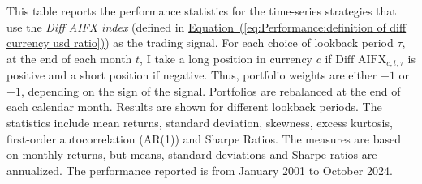 \documentclass[12pt,oneside,letter]{article}
\newcommand*{\myeq}[1]{\hyperref[{#1}]{Equation~(\ref*{#1})}}
\begin{document}
\begin{appendices}
\begin{landscape}
\begin{table}[h]
	
		\centering

	\end{table}
\end{landscape}


		\begin{landscape}
	\begin{table}[h]
		\caption{\bf Performance Statistics}   \label{tab:Performance:ts AI strategy diff performance statistics}
	
		\begin{footnotesize}
			This table reports the performance statistics for the time-series strategies that use the \textit{Diff AIFX index} (defined in \myeq{eq:Performance:definition of diff currency usd ratio}) as the trading signal. For each choice of lookback period \(\tau\), at  the end of each month \(t\), I take a long position in currency \(c\) if \(\text{Diff AIFX}_{c,t,\tau}\) is positive and a short position if negative. Thus, portfolio weights are either \(+1\) or \(-1\), depending on the sign of the signal. Portfolios are rebalanced at the end of each calendar month. Results are shown for different lookback periods. The statistics include mean returns, standard deviation, skewness, excess kurtosis, first-order autocorrelation (AR(1)) and Sharpe Ratios. The measures are based on monthly returns, but means, standard deviations and Sharpe ratios are annualized. The performance reported is from January 2001 to October 2024.
		\end{footnotesize}
	

\end{table}
\end{landscape}
\end{appendices}
\end{document}
